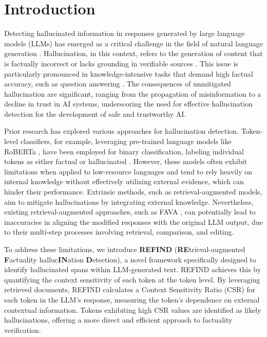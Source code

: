 \section{Introduction}

Detecting hallucinated information in responses generated by large language models (LLMs) has emerged as a critical challenge in the field of natural language generation \cite{Ji2023HallucinationSurvey, Zhang2023Sirens_Song_Hallucination}. 
Hallucination, in this context, refers to the generation of content that is factually incorrect or lacks grounding in verifiable sources \cite{li-etal-2024-dawn}. 
This issue is particularly pronounced in knowledge-intensive tasks that demand high factual accuracy, such as question answering \cite{Lee2022Factuality, sun-etal-2024-towards-verifiable}.
The consequences of unmitigated hallucination are significant, ranging from the propagation of misinformation to a decline in trust in AI systems, underscoring the need for effective hallucination detection for the development of safe and trustworthy AI.



Prior research has explored various approaches for hallucination detection. 
Token-level classifiers, for example, leveraging pre-trained language models like RoBERTa \cite{Liu2019RoBERTa}, have been employed for binary classification, labeling individual tokens as either factual or hallucinated \cite{liu-etal-2022-token}. 
However, these models often exhibit limitations when applied to low-resource languages and tend to rely heavily on internal knowledge without effectively utilizing external evidence, which can hinder their performance. 
Extrinsic methods, such as retrieval-augmented models, aim to mitigate hallucinations by integrating external knowledge.  
Nevertheless, existing retrieval-augmented approaches, such as FAVA \cite{mishra2024finegrained-FAVA}, can potentially lead to inaccuracies in aligning the modified responses with the original LLM output, due to their multi-step processes involving retrieval, comparison, and editing.

To address these limitations, we introduce \textbf{REFIND} (\textbf{RE}trieval-augmented \textbf{F}actuality halluc\textbf{IN}ation \textbf{D}etection), a novel framework specifically designed to identify hallucinated spans within LLM-generated text.  REFIND achieves this by quantifying the context sensitivity of each token at the token level.  
By leveraging retrieved documents, REFIND calculates a Context Sensitivity Ratio (CSR) for each token in the LLM's response, measuring the token's dependence on external contextual information. 
Tokens exhibiting high CSR values are identified as likely hallucinations, offering a more direct and efficient approach to factuality verification.


